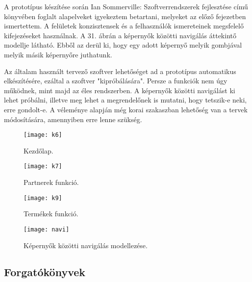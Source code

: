\documentclass[12pt]{article}
\begin{document}
 A prototípus készítése során Ian Sommerville: Szoftverrendszerek fejlesztése című könyvében foglalt alapelveket igyekeztem betartani, melyeket az előző fejezetben ismertettem. A felületek konzisztensek és a felhasználók ismereteinek megsfelelő kifejezéseket használnak. A 31. ábrán a képernyők közötti navigálás áttekintő modellje látható. Ebből az derül ki, hogy egy adott képernyő melyik gombjával melyik másik képernyőre juthatunk. 

Az általam használt tervező szoftver lehetőséget ad a prototípus automatikus elkészítésére, ezáltal a szoftver "kipróbálására". Persze a funkciók  nem úgy működnek, mint majd az éles rendszerben. A képernyők közötti navigálást ki lehet próbálni, illetve meg lehet a megrendelőnek is mutatni, hogy tetszik-e neki, erre gondolt-e. A véleménye alapján még korai szakaszban lehetőség van a tervek módosítására, amennyiben erre lenne szükség.

 




\begin{figure}
\texttt{[image: k6]}
\caption{Kezdőlap.}
\end{figure}

\begin{figure}
\texttt{[image: k7]}
\caption{Partnerek funkció.}
\end{figure}

\begin{figure}
\texttt{[image: k9]}
\caption{Termékek funkció.}
\end{figure}

\begin{figure}
\texttt{[image: navi]}
\caption{Képernyők közötti navigálás modellezése.}
\end{figure}


\newpage
\subsection{ Forgatókönyvek}
\end{document}
